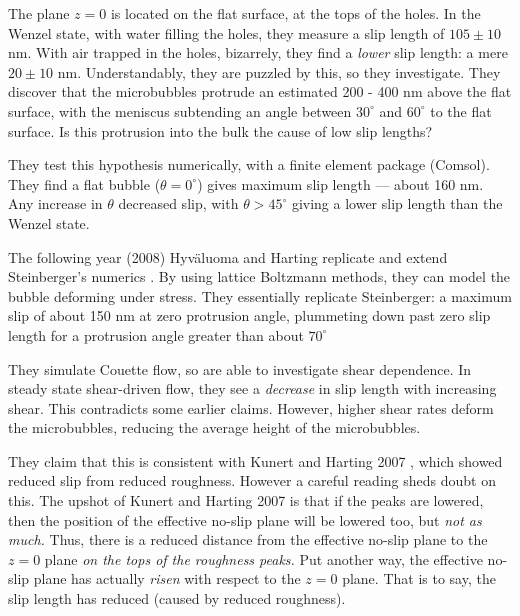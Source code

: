 \documentclass[12pt, a4paper, twoside, openright]{book}
\begin{document}
The plane $z=0$ is located on the flat surface, at the tops of the holes.  In the Wenzel state, with water filling the holes, they measure a slip length of $105 \pm 10$ nm.  With air trapped in the holes, bizarrely, they find a \emph{lower} slip length: a mere $20 \pm 10$ nm.  Understandably, they are puzzled by this, so they investigate.  They discover that the microbubbles protrude an estimated 200 - 400 nm above the flat surface, with the meniscus subtending an angle between $30^{\circ}$ and $60^{\circ}$ to the flat surface.  Is this protrusion into the bulk the cause of low slip lengths?

They test this hypothesis numerically, with a finite element package (Comsol).  They find a flat bubble ($\theta = 0^{\circ}$) gives maximum slip length --- about 160 nm.  Any increase in $\theta$ decreased slip, with $\theta > 45^{\circ}$ giving a lower slip length than the Wenzel state.

The following year (2008) Hyv\"{a}luoma and Harting replicate and extend Steinberger's numerics \cite{HyvaluomaHarting2008}.  By using lattice Boltzmann methods, they can model the bubble deforming under stress.  They essentially replicate Steinberger: a maximum slip of about 150 nm at zero protrusion angle, plummeting down past zero slip length for a protrusion angle greater than about $70^{\circ}$

They simulate Couette flow, so are able to investigate shear dependence.  In steady state shear-driven flow, they see a \emph{decrease} in slip length with increasing shear.  This contradicts some earlier claims.  However, higher shear rates deform the microbubbles, reducing the average height of the microbubbles.

They claim that this is consistent with Kunert and Harting 2007 \cite{KunertHarting2007}, which showed reduced slip from reduced roughness.
However a careful reading sheds doubt on this. The upshot of Kunert and Harting 2007 \cite{KunertHarting2007} is that if the peaks are lowered, then the position of the effective no-slip plane will be lowered too, but \emph{not as much.}  Thus, there is a reduced distance from the effective no-slip plane to the $z=0$ plane \emph{on the tops of the roughness peaks.} Put another way, the effective no-slip plane has actually \emph{risen} with respect to the $z=0$ plane. That is to say, the slip length has reduced (caused by reduced roughness).  
\end{document}

